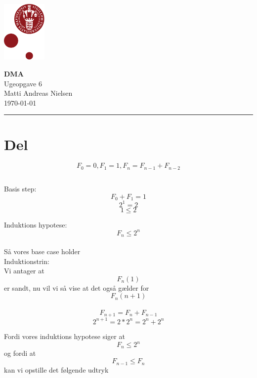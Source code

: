 \documentclass[12pt, a4paper, hidelinks]{article}
\begin{document}
\begin{minipage}[b]{1.0\linewidth}
\includegraphics[height=30mm]{bilag/KULogo}

\vspace*{-16ex}
\begin{center}
    {\Large \bf DMA} \vspace*{1ex} \\
    {\large Ugeopgave 6} \vspace*{1ex} \\
    {\large Matti Andreas Nielsen  } \\
    {\large \today{}  }
\end{center}
\vspace*{-3pt}
{\color{KU-red}\hrule}
\end{minipage}
\vspace{2ex}

\tableofcontents \newpage

\section{Del}
$$ F_{0} = 0, F_{1} = 1, F_{n} = F_{n-1} + F_{n-2}  $$

\subsection{}

Basis step: 
$$ F_{0} + F_{1} = 1 $$
$$ 2^1 = 2 $$
$$ 1 \leq 2   $$

Induktions hypotese: $$ F_{n} \leq 2^n $$ \\

Så vores base case holder\\

Induktionstrin: \\
Vi antager at $$ F_{n}(1) $$ er sandt, nu vil vi så vise at det også gælder for $$ F_{n}(n+1) $$ \\

$$ F_{n+1} = F_{n} + F_{n-1} $$
$$ 2^{n+1} = 2*2^n = 2^n+2^n  $$

Fordi vores induktions hypotese siger at $$ F_{n} \leq 2^n $$ 
og fordi at $$ F_{n-1} \leq F_{n} $$ kan vi
opstille det følgende udtryk
\end{document}
